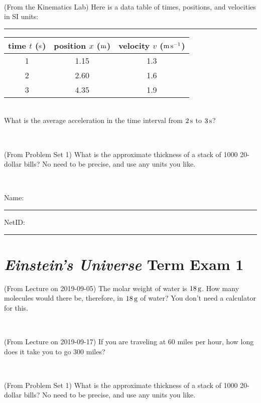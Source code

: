 \documentclass[12pt, letterpaper]{article}
\begin{document}
\vfill ~

\begin{problem} (From the Kinematics Lab)
Here is a data table of times, positions, and velocities in SI units:\\
\rule{1.0in}{0pt}\begin{tabular}{c|c|c}
time $t$ ($\mathrm{s}$) & position $x$ ($\mathrm{m}$) & velocity $v$ ($\mathrm{m}\,\mathrm{s}^{-1}$) \\
\hline
1 & 1.15 & 1.3 \\
2 & 2.60 & 1.6 \\
3 & 4.35 & 1.9 \\
\hline
\end{tabular}\\
What is the average acceleration in the time interval from $2\,\mathrm{s}$ to $3\,\mathrm{s}$?
\end{problem}


\vfill ~

\begin{problem} (From Problem Set 1)
What is the approximate thickness of a stack of 1000 20-dollar bills?
No need to be precise, and use any units you like.
\end{problem}


\vfill ~


\cleardoublepage



\noindent
Name: \rule[-1ex]{0.60\textwidth}{0.1pt}
NetID: \rule[-1ex]{0.20\textwidth}{0.1pt}

\section*{\textsl{Einstein's Universe} Term Exam 1}
\setcounter{problem}{1}


\begin{problem} (From Lecture on 2019-09-05)
The molar weight of water is $18\,\mathrm{g}$. How many molecules would there
be, therefore, in $18\,\mathrm{g}$ of water? You don't need a calculator for
this.
\end{problem}


\vfill ~

\begin{problem} (From Lecture on 2019-09-17)
If you are traveling at 60 miles per hour, how long does
it take you to go 300 miles?
\end{problem}


\vfill ~

\begin{problem} (From Problem Set 1)
What is the approximate thickness of a stack of 1000 20-dollar bills?
No need to be precise, and use any units you like.
\end{problem}
\end{document}
